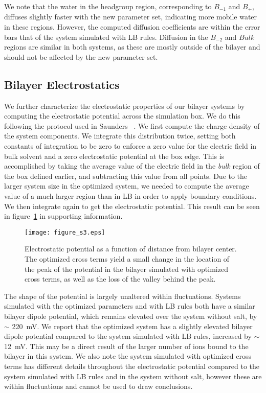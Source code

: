 We note that the water in the headgroup region, corresponding to $B_{-1}$ and $B_+$, 
diffuses slightly faster with the new parameter set, 
indicating more mobile water in these regions. 
However, the computed diffusion coefficients are within the error bars that of the system simulated with LB rules. 
Diffusion in the $B_{-2}$ and $Bulk$ regions are similar in both systems, 
as these are mostly outside of the bilayer and should not be affected by the new parameter set.


\subsection{Bilayer Electrostatics}

We further characterize the electrostatic properties of our bilayer
systems by computing the electrostatic potential across the simulation box. 
We do this following the protocol used in Saunders \etal
~\cite{saunders:2019}. We first compute the charge density of the
system components. We integrate this distribution twice, setting both
constants of integration to be zero to enforce a zero value for the
electric field in bulk solvent and a zero electrostatic potential at
the box edge. This is accomplished by taking the average value of the
electric field in the \emph{bulk} region of the box defined earlier,
and subtracting this value from all points. Due to the larger system
size in the optimized system, we needed to compute the average value of a much
larger region than in LB in order to apply boundary conditions. We
then integrate again to get the electrostatic potential. This result
can be seen in figure~\ref{figch2:potential} in supporting information. 
\begin{figure}[h!tb]
    \caption[Bilayer electrostatic potential]{ Electrostatic potential as a function of distance from bilayer center. The optimized
cross terms yield a small change in the location of the peak of the potential in the
bilayer simulated with optimized cross terms, as well as the loss of the valley behind the peak.
}
    \label{figch2:potential}
    \texttt{[image: figure\_s3.eps]}
\end{figure}
The shape of the potential
is largely unaltered within fluctuations. Systems simulated with the
optimized parameters and with LB rules both have a similar bilayer dipole potential, 
which remains elevated over
the system without salt, by $\sim$ 220~mV.  We report 
that the optimized system has a slightly
elevated bilayer dipole potential compared to the system simulated with
LB rules, increased by $\sim$ 12~mV.
This may be a direct result of the larger number of
ions bound to the bilayer in this system.  We also note the system simulated with optimized cross terms
has different details
throughout the electrostatic potential compared to the system simulated with LB rules and in the
system without salt, however these are within fluctuations and cannot be used to draw conclusions.

